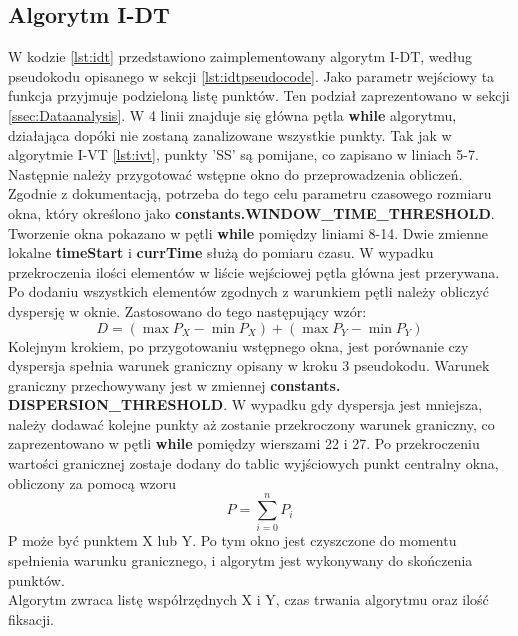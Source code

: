 \subsection{Algorytm I-DT}
\label{ssec:implementidt}
W kodzie \ref{lst:idt} przedstawiono zaimplementowany algorytm I-DT, według pseudokodu opisanego w sekcji \ref{lst:idtpseudocode}. Jako parametr wejściowy ta funkcja przyjmuje podzieloną listę punktów. Ten podział zaprezentowano w sekcji \ref{ssec:Dataanalysis}. W 4 linii znajduje się główna pętla \textbf{while} algorytmu, działająca dopóki nie zostaną zanalizowane wszystkie punkty. Tak jak w algorytmie I-VT \ref{lst:ivt}, punkty 'SS' są pomijane, co zapisano w liniach 5-7. Następnie należy przygotować wstępne okno do przeprowadzenia obliczeń. Zgodnie z dokumentacją, potrzeba do tego celu parametru czasowego rozmiaru okna, który określono jako \textbf{constants.WINDOW\_TIME\_THRESHOLD}. Tworzenie okna pokazano w pętli \textbf{while} pomiędzy liniami 8-14. Dwie zmienne lokalne \textbf{timeStart} i \textbf{currTime} służą do pomiaru czasu. W wypadku przekroczenia ilości elementów w liście wejściowej pętla główna jest przerywana. Po dodaniu wszystkich elementów zgodnych z warunkiem pętli należy obliczyć dyspersję w oknie. Zastosowano do tego następujący wzór:
\[
        D = (\max{P_X} - \min{P_X}) + (\max{P_Y} - \min{P_Y})
\]
Kolejnym krokiem, po przygotowaniu wstępnego okna, jest porównanie czy dyspersja spełnia warunek graniczny opisany w kroku 3 pseudokodu. Warunek graniczny przechowywany jest w zmiennej \textbf{constants. DISPERSION\_THRESHOLD}. W wypadku gdy dyspersja jest mniejsza, należy dodawać kolejne punkty aż zostanie przekroczony warunek graniczny, co zaprezentowano w pętli \textbf{while} pomiędzy wierszami 22 i 27. Po przekroczeniu wartości granicznej zostaje dodany do tablic wyjściowych punkt centralny okna, obliczony za pomocą wzoru
\[
        P = \sum_{i = 0}^{n}{P_i}
\]
P może być punktem X lub Y. Po tym okno jest czyszczone do momentu spełnienia warunku granicznego, i algorytm jest wykonywany do skończenia punktów.\\
Algorytm zwraca listę współrzędnych X i Y, czas trwania algorytmu oraz ilość fiksacji.
